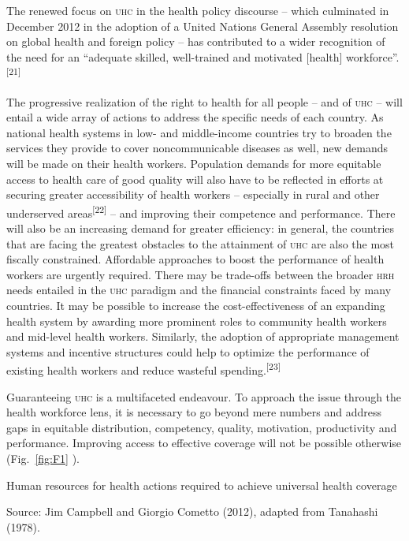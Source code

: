 \documentclass{article}
\begin{document}
The renewed focus on \textsc{uhc} in the health policy discourse – which culminated in
December
2012 in the adoption of a United Nations General Assembly resolution on global
health and foreign
policy – has contributed to a wider recognition of the need for an “adequate
skilled,
well-trained and motivated [health]
workforce”.\textsuperscript{[}\textsuperscript{21}\textsuperscript{]}

The progressive realization of the right to health for all people – and of \textsc{uhc} –
will entail a wide array of actions to address the specific needs of each
country. As national
health systems in low- and middle-income countries try to broaden the services
they provide to cover
noncommunicable diseases as well, new demands will be made on their health
workers. Population
demands for more equitable access to health care of good quality will also have
to be reflected in
efforts at securing greater accessibility of health workers – especially in
rural and other
underserved areas\textsuperscript{[}\textsuperscript{22}\textsuperscript{]}
– and improving their
competence and performance. There will also be an increasing demand for greater
efficiency: in
general, the countries that are facing the greatest obstacles to the attainment
of \textsc{uhc} are also the
most fiscally constrained. Affordable approaches to boost the performance of
health workers are
urgently required. There may be trade-offs between the broader \textsc{hrh} needs
entailed in the \textsc{uhc}
paradigm and the financial constraints faced by many countries. It may be
possible to increase the
cost-effectiveness of an expanding health system by awarding more prominent
roles to community
health workers and mid-level health workers. Similarly, the adoption of
appropriate management
systems and incentive structures could help to optimize the performance of
existing health workers
and reduce wasteful spending.\textsuperscript{[}\textsuperscript{23}\textsuperscript{]}

Guaranteeing \textsc{uhc} is a multifaceted endeavour. To approach the issue through the
health workforce
lens, it is necessary to go beyond mere numbers and address gaps in equitable
distribution,
competency, quality, motivation, productivity and performance. Improving access
to effective
coverage will not be possible otherwise (Fig.~\ref{fig:F1}
).

Human resources for health actions required to achieve universal health coverage

Source: Jim Campbell and Giorgio Cometto (2012), adapted from Tanahashi (1978).
\end{document}
